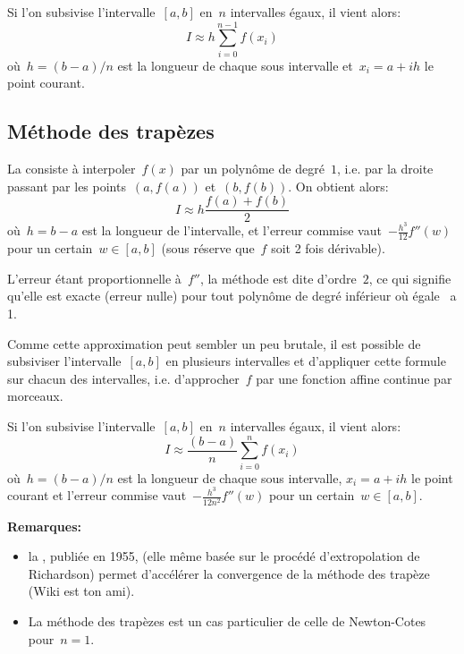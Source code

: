 Si l'on subsivise l'intervalle~$[a,b]$ en~$n$ intervalles égaux, il vient alors:
\begin{equation}I\approx h\sum_{i=0}^{n-1} f(x_i)\end{equation}
où~$h=(b-a)/n$ est la longueur de chaque sous intervalle et~$x_i=a+ih$ le
point courant.




\medskip
\subsection*{Méthode des trapèzes}

La  consiste à interpoler~$f(x)$ par un polynôme 
de degré~$1$, i.e. par la droite passant par les points~$(a,f(a))$ et~$(b,f(b))$.
On obtient alors:
\begin{equation} I\approx h\dfrac{f(a)+f(b)}2\end{equation}
où~$h=b-a$ est la longueur de l'intervalle,
et l'erreur commise vaut~$-\frac{h^3}{12} f''(w)$ pour un certain~$w\in[a,b]$
(sous réserve que~$f$ soit 2 fois dérivable).

L'erreur étant proportionnelle à~$f''$, la méthode est dite d'ordre~$2$, ce qui
signifie qu'elle est exacte (erreur nulle) pour tout polynôme de degré inférieur
où égale \ a 1.

\medskip
Comme cette approximation peut sembler un peu brutale, il est possible de subsiviser
l'intervalle~$[a,b]$ en plusieurs intervalles et d'appliquer cette formule sur chacun
des intervalles, i.e. d'approcher~$f$ par une fonction affine continue par morceaux.

Si l'on subsivise l'intervalle~$[a,b]$ en~$n$ intervalles égaux, il vient alors:
\begin{equation}I\approx \frac{(b-a)}{n}\sum_{i=0}^{n}f(x_i)\end{equation}
où~$h=(b-a)/n$ est la longueur de chaque sous intervalle, $x_i=a+ih$ le
point courant et l'erreur commise vaut~$-\frac{h^3}{12n^2} f''(w)$ pour un certain~$w\in[a,b]$.

\medskip
\textbf{Remarques:}
\begin{itemize}
\item la , publiée en 1955,
(elle même basée sur le procédé d'extropolation de Richardson)
permet d'accélérer la convergence de la méthode des trapèze (Wiki est ton ami).
\item La méthode des trapèzes est un cas particulier de celle de Newton-Cotes pour~$n=1$.
\end{itemize}

